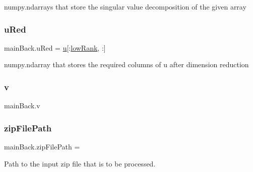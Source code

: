 numpy.\+ndarrays that store the singular value decomposition of the given array 

\mbox{\label{namespacemain_back_a5219f1f00f1e13deec736f49b9019c11}} 
\subsubsection{\texorpdfstring{u\+Red}{uRed}}
{\footnotesize\ttfamily main\+Back.\+u\+Red = \hyperlink{namespacemain_back_acf43846c5a893d78f9a0e7fccf1ba489}{u}\mbox{[}\+:\hyperlink{namespacemain_back_aee2ac20a3d81f9f6762e47cad7268a32}{low\+Rank}, \+:\mbox{]}}



numpy.\+ndarray that stores the required columns of u after dimension reduction 

\mbox{\label{namespacemain_back_a92b2e5bb31556f8f2634ccb0d66c3fa3}} 
\subsubsection{\texorpdfstring{v}{v}}
{\footnotesize\ttfamily main\+Back.\+v}

\mbox{\label{namespacemain_back_adf7077a22f3e33482f58fd6d892c112e}} 
\subsubsection{\texorpdfstring{zip\+File\+Path}{zipFilePath}}
{\footnotesize\ttfamily main\+Back.\+zip\+File\+Path = \textquotesingle{}\textquotesingle{}}



Path to the input zip file that is to be processed. 

